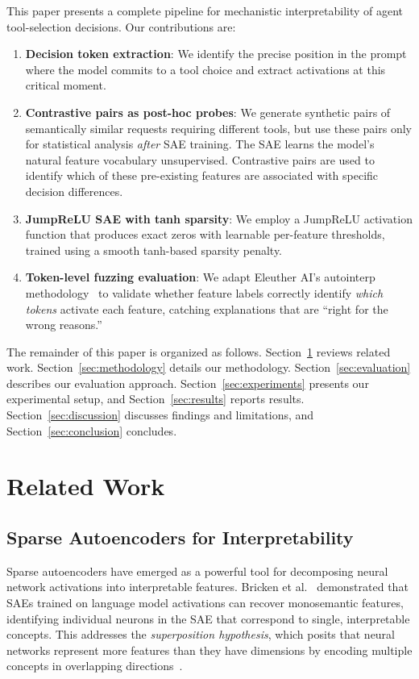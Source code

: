 \documentclass[runningheads]{llncs}
\begin{document}
This paper presents a complete pipeline for mechanistic interpretability of agent tool-selection decisions. Our contributions are:

\begin{enumerate}
\item \textbf{Decision token extraction}: We identify the precise position in the prompt where the model commits to a tool choice and extract activations at this critical moment.
\item \textbf{Contrastive pairs as post-hoc probes}: We generate synthetic pairs of semantically similar requests requiring different tools, but use these pairs only for statistical analysis \emph{after} SAE training. The SAE learns the model's natural feature vocabulary unsupervised. Contrastive pairs are used to identify which of these pre-existing features are associated with specific decision differences.
\item \textbf{JumpReLU SAE with tanh sparsity}: We employ a JumpReLU activation function that produces exact zeros with learnable per-feature thresholds, trained using a smooth tanh-based sparsity penalty.
\item \textbf{Token-level fuzzing evaluation}: We adapt Eleuther AI's autointerp methodology~\cite{ref_juang2024} to validate whether feature labels correctly identify \emph{which tokens} activate each feature, catching explanations that are ``right for the wrong reasons.''
\end{enumerate}

The remainder of this paper is organized as follows. Section~\ref{sec:related} reviews related work. Section~\ref{sec:methodology} details our methodology. Section~\ref{sec:evaluation} describes our evaluation approach. Section~\ref{sec:experiments} presents our experimental setup, and Section~\ref{sec:results} reports results. Section~\ref{sec:discussion} discusses findings and limitations, and Section~\ref{sec:conclusion} concludes.


\section{Related Work}
\label{sec:related}

\subsection{Sparse Autoencoders for Interpretability}

Sparse autoencoders have emerged as a powerful tool for decomposing neural network activations into interpretable features. Bricken et al.~\cite{ref_bricken2023} demonstrated that SAEs trained on language model activations can recover monosemantic features, identifying individual neurons in the SAE that correspond to single, interpretable concepts. This addresses the \emph{superposition hypothesis}, which posits that neural networks represent more features than they have dimensions by encoding multiple concepts in overlapping directions~\cite{elhage2022toymodelssuperposition}.
\end{document}
